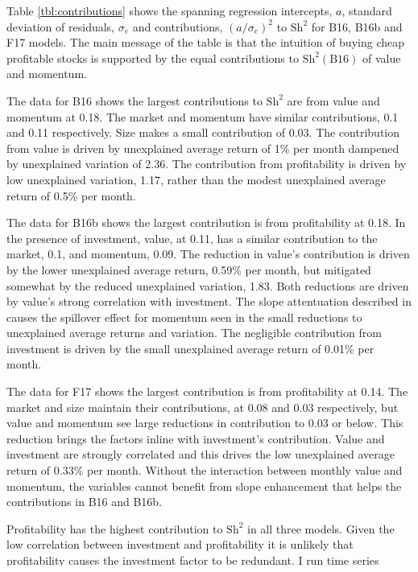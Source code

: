 
Table \ref{tbl:contributions} shows the spanning regression intercepts,
$a$, standard deviation of residuals, $\sigma_e$ and contributions,
$(a/\sigma_e)^2$ to $\text{Sh}^2$ for B16, B16b and F17 models.
The main message of the table is that the intuition of buying cheap profitable
stocks is supported by the equal contributions to $\text{Sh}^2(\text{B16})$ of
value and momentum.

The data for B16 shows the largest contributions to $\text{Sh}^2$ are from
value and momentum at 0.18.
The market and momentum have similar contributions, 0.1 and 0.11 respectively.
Size makes a small contribution of 0.03.
The contribution from value is driven by unexplained average return of 1\% per
month dampened by unexplained variation of 2.36.
The contribution from profitability is driven by low unexplained variation,
1.17, rather than the modest unexplained average return of 0.5\% per month.

The data for B16b shows the largest contribution is from profitability at 0.18.
In the presence of investment, value, at 0.11, has a similar contribution to
the market, 0.1, and momentum, 0.09.
The reduction in value's contribution is driven by the lower unexplained
average return, 0.59\% per month, but mitigated somewhat by the reduced
unexplained variation, 1.83.
Both reductions are driven by value's strong correlation with investment.
The slope attentuation described in \textcite{fama2015incremental} causes the
spillover effect for momentum seen in the small reductions to unexplained
average returns and variation.
The negligible contribution from investment is driven by the small unexplained
average return of 0.01\% per month.

The data for F17 shows the largest contribution is from profitability at 0.14.
The market and size maintain their contributions, at 0.08 and 0.03
respectively, but value and momentum see large reductions in contribution to
0.03 or below.
This reduction brings the factors inline with investment's contribution.
Value and investment are strongly correlated and this drives the low
unexplained average return of 0.33\% per month.
Without the interaction between monthly value and momentum, the variables
cannot benefit from slope enhancement that helps the contributions in B16 and
B16b.

Profitability has the highest contribution to $\text{Sh}^2$ in all three
models.
Given the low correlation between investment and profitability it is unlikely
that profitability causes the investment factor to be redundant.
I run time series regressions of investment on selected other factors to see
which factors subsume investment.

